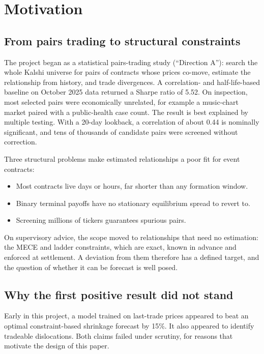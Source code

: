 \documentclass[11pt,a4paper]{article}
\begin{document}
\section{Motivation}

\subsection{From pairs trading to structural constraints}
The project began as a statistical pairs-trading study (``Direction A''): search
the whole Kalshi universe for pairs of contracts whose prices co-move, estimate
the relationship from history, and trade divergences. A correlation- and
half-life-based baseline on October 2025 data returned a Sharpe ratio of 5.52.
On inspection, most selected pairs were economically unrelated, for example a
music-chart market paired with a public-health case count. The result is best
explained by multiple testing. With a 20-day lookback, a correlation of about
0.44 is nominally significant, and tens of thousands of candidate pairs were
screened without correction.

Three structural problems make estimated relationships a poor fit for event
contracts:
\begin{itemize}
  \item Most contracts live days or hours, far shorter than any formation window.
  \item Binary terminal payoffs have no stationary equilibrium spread to revert to.
  \item Screening millions of tickers guarantees spurious pairs.
\end{itemize}
On supervisory advice, the scope moved to relationships that need no
estimation: the MECE and ladder constraints, which are exact, known in advance
and enforced at settlement. A deviation from them therefore has a defined target,
and the question of whether it can be forecast is well posed.

\subsection{Why the first positive result did not stand}
Early in this project, a model trained on last-trade prices appeared to beat an
optimal constraint-based shrinkage forecast by 15\%. It also appeared to identify
tradeable dislocations. Both claims failed under scrutiny, for reasons that
motivate the design of this paper.
\end{document}
